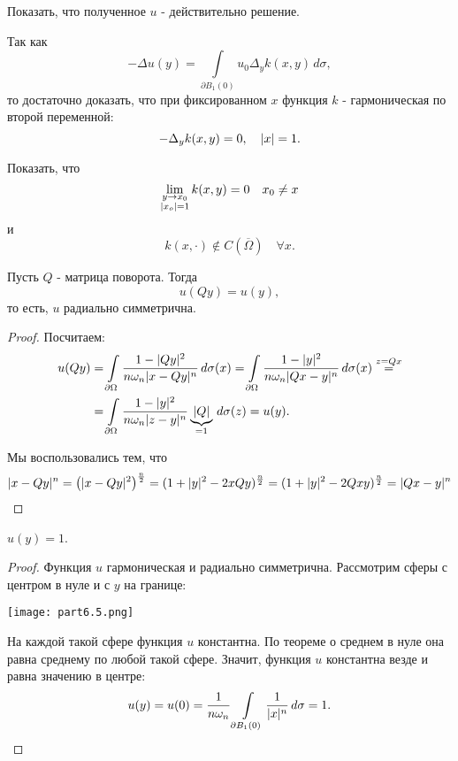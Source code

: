 \begin{exercise} Показать, что полученное $u$ - действительно решение.
\end{exercise}
\begin{note}Так как
$$- \Delta u(y) = \int \limits_{\partial B_1 (0)} u_0 \Delta_y k(x, y) \, d\sigma,$$
то достаточно доказать, что при фиксированном $x$ функция $k$ - гармоническая по второй переменной:
$$ - \Delta_y k(x,y) = 0, \quad \lvert x\rvert = 1.$$
\end{note}

\begin{exercise} Показать, что
$$ \lim_{\substack{y \to x_0 \\ \lvert x_o\rvert = 1}} k(x, y) = 0 \quad x_0 \neq x$$
и
$$ k( x, \cdot) \notin C(\overline{\Omega}) \quad \forall x.$$
\end{exercise}

\begin{note}Пусть $Q$ - матрица поворота. Тогда
$$ u(Qy) = u(y),$$
то есть, $u$ радиально симметрична.
\end{note}
\begin{proof}
Посчитаем:
\begin{align*}
	u(Qy) &= \int \limits_{\partial \Omega} \frac {1 - \lvert Qy\rvert^2} {n \omega_n \lvert x-Qy\rvert^n} \, d\sigma(x) = \int \limits_{\partial \Omega} \frac {1 - \lvert y\rvert^2} {n \omega_n \lvert Qx-y\rvert^n} \, d\sigma(x) \stackrel{z = Qx} = \\
	&= \int \limits_{\partial \Omega} \frac {1 - \lvert y\rvert^2} {n \omega_n \lvert z - y\rvert^n} \underbrace {\lvert Q\rvert}_{=1} \, d\sigma(z) = u(y). 
\end{align*}

Мы воспользовались тем, что
\begin{align*}
	\lvert x-Qy\rvert^n = \left( \lvert x-Qy\rvert^2 \right)^{\frac {n} {2}} = (1 + \lvert y\rvert^2 - 2 x Q y)^{\frac {n} {2}} = (1 + \lvert y\rvert^2 - 2Qxy)^{\frac {n} {2}} = \lvert Qx - y\rvert^n
\end{align*}

\end{proof}

\begin{note} $u(y) = 1$.
\end{note}
\begin{proof}
Функция $u$ гармоническая и радиально симметрична. Рассмотрим сферы с центром в нуле и с $y$ на границе:
\begin{center}
\texttt{[image: part6.5.png]}
\end{center}
На каждой такой сфере функция $u$ константна. По теореме о среднем в нуле она равна среднему по любой такой сфере. Значит, функция $u$ константна везде и равна значению в центре:
$$ u(y) = u(0) = \frac {1} {n \omega_n} \int \limits_{\partial B_1 (0)} \frac {1} {\lvert x\rvert^n} \, d\sigma = 1.$$

\end{proof}

